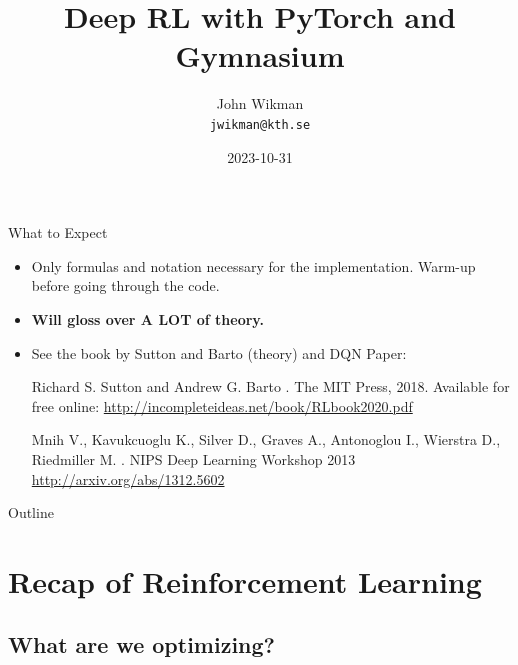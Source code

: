 \documentclass[aspectratio=1609,ADDITIONAL_DOCCLASS_ARGS]{beamer}
\title{Deep RL with PyTorch and Gymnasium}
\author{\parbox[t][5mm][c]{5cm}{\centering John Wikman\\\small{\texttt{jwikman@kth.se}}\vspace{5mm}}}
\institute{KTH Royal Institute of Technology}
\date{2023-10-31}
\begin{document}
\frame[plain, t]{\titlepage}


\begin{frame}{What to Expect}
  \begin{itemize}
  \setlength\itemsep{2mm}
  \item<1-> Only formulas and notation necessary for the
        implementation. Warm-up before going through the code.
  \item<2-> \textbf{Will gloss over A LOT of theory.}
  \item<3-> See the book by Sutton and Barto (theory) and DQN Paper:
  {\small
        \begin{thebibliography}{10}

        \beamertemplatebookbibitems

          Richard S. Sutton and Andrew G. Barto
          .
          \newblock The MIT Press, 2018.
          \vspace{1mm}
          \newblock Available for free online:
          \newblock \url{http://incompleteideas.net/book/RLbook2020.pdf}

        \beamertemplatearticlebibitems

          Mnih V., Kavukcuoglu K., Silver D., Graves A., Antonoglou I., Wierstra D., Riedmiller M.
          .
          \newblock NIPS Deep Learning Workshop 2013
          \newblock \url{http://arxiv.org/abs/1312.5602}
        \end{thebibliography}
  }
  \end{itemize}
\end{frame}

\begin{frame}{Outline}
  \tableofcontents
\end{frame}

\section{Recap of Reinforcement Learning}
\subsection{What are we optimizing?}
\end{document}
